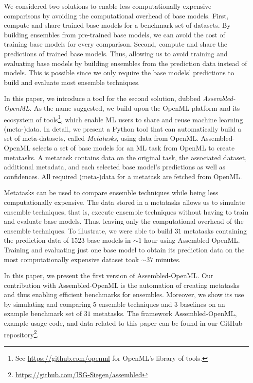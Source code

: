 \documentclass[11pt]{article}
\begin{document}
We considered two solutions to enable less computationally expensive comparisons by avoiding the computational overhead of base models. 
First, compute and share trained base models for a benchmark set of datasets. By building ensembles from pre-trained base models, we can avoid the cost of training base models for every comparison. 
Second, compute and share the predictions of trained base models. Thus, allowing us to avoid training and evaluating base models by building ensembles from the prediction data instead of models. This is possible since we only require the base models' predictions to build and evaluate most ensemble techniques. 

In this paper, we introduce a tool for the second solution, dubbed \emph{Assembled-OpenML}.
As the name suggested, we build upon the OpenML platform \citep{DBLP:journals/corr/VanschorenRBT14} and its ecosystem of tools\footnote{See \url{https://github.com/openml} for OpenML's library of tools.}, which enable ML users to share and reuse machine learning (meta-)data. 
In detail, we present a Python tool that can automatically build a set of meta-datasets, called \emph{Metatasks}, using data from OpenML.
Assembled-OpenML selects a set of base models for an ML task from OpenML to create metatasks. %
A metatask contains data on the original task, the associated dataset, additional metadata, and each selected base model's predictions as well as confidences. All required (meta-)data for a metatask are fetched from OpenML. 

Metatasks can be used to compare ensemble techniques while being less computationally expensive. 
The data stored in a metatasks allows us to simulate ensemble techniques, that is, execute ensemble techniques without having to train and evaluate base models. Thus, leaving only the computational overhead of the ensemble techniques.
To illustrate, we were able to build $31$ metatasks containing the prediction data of $1523$ base models in ${\sim} 1$ hour using Assembled-OpenML. Training and evaluating just one base model to obtain its prediction data on the most computationally expensive dataset took ${\sim} 37$ minutes.  

In this paper, we present the first version of Assembled-OpenML.
Our contribution with Assembled-OpenML is the automation of creating metatasks and thus enabling efficient benchmarks for ensembles.
Moreover, we show its use by simulating and comparing $5$ ensemble techniques and $3$ baselines on an example benchmark set of $31$ metatasks. 
The framework Assembled-OpenML, example usage code, and data related to this paper can be found in our GitHub repository\footnote{\url{https://github.com/ISG-Siegen/assembled}}.
\end{document}
